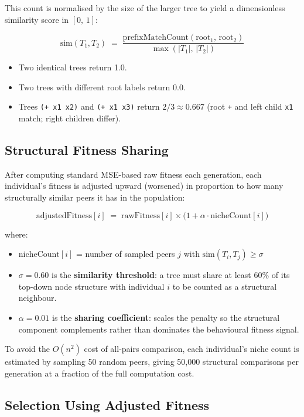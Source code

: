 \documentclass[12pt,a4paper]{article}
\begin{document}
This count is normalised by the size of the larger tree to yield a dimensionless
similarity score in $[0,\, 1]$:

\[
\text{sim}(T_1, T_2) \;=\; \frac{\text{prefixMatchCount}(\text{root}_1,\, \text{root}_2)}{\max(|T_1|,\, |T_2|)}
\]

\begin{itemize}
  \item Two identical trees return 1.0.
  \item Two trees with different root labels return 0.0.
  \item Trees \texttt{(+ x1 x2)} and \texttt{(+ x1 x3)} return $2/3 \approx 0.667$
        (root \texttt{+} and left child \texttt{x1} match; right children differ).
\end{itemize}

\subsection{Structural Fitness Sharing}

After computing standard MSE-based raw fitness each generation, each individual's
fitness is adjusted upward (worsened) in proportion to how many structurally
similar peers it has in the population:

\[
\text{adjustedFitness}[i] \;=\; \text{rawFitness}[i] \times \bigl(1 + \alpha \cdot \text{nicheCount}[i]\bigr)
\]

where:
\begin{itemize}
  \item $\text{nicheCount}[i]$ = number of sampled peers $j$ with $\text{sim}(T_i, T_j) \geq \sigma$
  \item $\sigma = 0.60$ is the \textbf{similarity threshold}: a tree must share at
        least 60\% of its top-down node structure with individual $i$ to be counted
        as a structural neighbour.
  \item $\alpha = 0.01$ is the \textbf{sharing coefficient}: scales the penalty so
        the structural component complements rather than dominates the behavioural
        fitness signal.
\end{itemize}

To avoid the $O(n^2)$ cost of all-pairs comparison, each individual's niche count
is estimated by sampling 50 random peers, giving 50,000 structural comparisons
per generation at a fraction of the full computation cost.

\subsection{Selection Using Adjusted Fitness}
\end{document}
